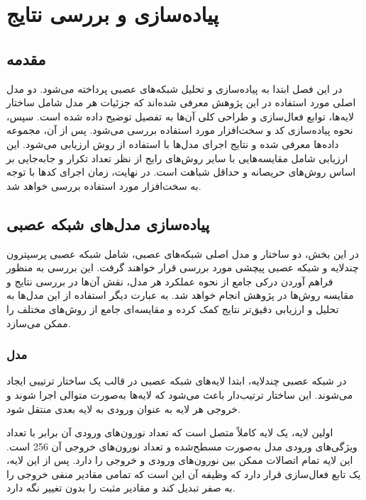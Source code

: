 \chapter{پیاده‌سازی و بررسی نتایج}

\section{مقدمه}
در این فصل ابتدا به پیاده‌سازی و تحلیل شبکه‌های عصبی پرداخته می‌شود. دو مدل اصلی مورد استفاده در این پژوهش معرفی شده‌اند که جزئیات هر مدل شامل ساختار لایه‌ها، توابع فعال‌سازی و طراحی کلی آن‌ها به تفصیل توضیح داده شده است. سپس، نحوه پیاده‌سازی کد و سخت‌افزار مورد استفاده بررسی می‌شود. پس از آن، مجموعه داده‌ها معرفی شده و نتایج اجرای مدل‌ها با استفاده از روش
ارزیابی می‌شود. این ارزیابی شامل مقایسه‌هایی با سایر روش‌های رایج از نظر تعداد تکرار و جابه‌جایی بر اساس روش‌های حریصانه و حداقل شباهت است. در نهایت، زمان اجرای کدها با توجه به سخت‌افزار مورد استفاده بررسی خواهد شد.


\section{پیاده‌سازی مدل‌های شبکه عصبی}
در این بخش، دو ساختار و مدل اصلی شبکه‌های عصبی، شامل شبکه عصبی پرسپترون چندلایه%
و شبکه عصبی پیچشی%
مورد بررسی قرار خواهند گرفت.
این بررسی به منظور فراهم آوردن درکی جامع از نحوه عملکرد هر مدل، نقش آن‌ها در بررسی نتایج و مقایسه روش‌ها در پژوهش انجام خواهد شد. به عبارت دیگر استفاده از این مدل‌ها به تحلیل و ارزیابی دقیق‌تر نتایج کمک کرده و مقایسه‌ای جامع از روش‌های مختلف را ممکن می‌سازد.

\subsection{
	مدل
}
در شبکه عصبی چندلایه، ابتدا لایه‌های شبکه عصبی در قالب یک ساختار ترتیبی%
ایجاد می‌شوند. این ساختار ترتیب‌دار باعث می‌شود که لایه‌ها به‌صورت متوالی اجرا شوند و خروجی هر لایه به عنوان ورودی به لایه بعدی منتقل شود.

اولین لایه، یک لایه کاملاً متصل است که تعداد نورون‌های ورودی آن برابر با تعداد ویژگی‌های ورودی مدل به‌صورت مسطح‌شده و تعداد نورون‌های خروجی آن 256 است. این لایه تمام اتصالات ممکن بین نورون‌های ورودی و خروجی را دارد. پس از این لایه، یک تابع فعال‌سازی 
قرار دارد که وظیفه آن این است که تمامی مقادیر منفی خروجی را به صفر تبدیل کند و مقادیر مثبت را بدون تغییر نگه دارد.

